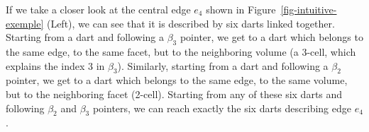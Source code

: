 If we take a closer look at the central edge $e_4$ shown in
Figure~\ref{fig-intuitive-exemple} (Left), we can see that it is
described by six darts linked together.  Starting from a dart and
following a $\beta_3$ pointer, we get to a dart which belongs to the
same edge, to the same facet, but to the neighboring volume (a 3-cell,
which explains the index 3 in $\beta_3$).  Similarly, starting from
a dart and following a $\beta_2$ pointer, we get to a dart which
belongs to the same edge, to the same volume, but to the neighboring
facet (2-cell). Starting from any of these six darts and following
$\beta_2$ and $\beta_3$ pointers, we can reach exactly the six darts
describing edge $e_4$.
%
%
\def\LargFig{.3\textwidth}
